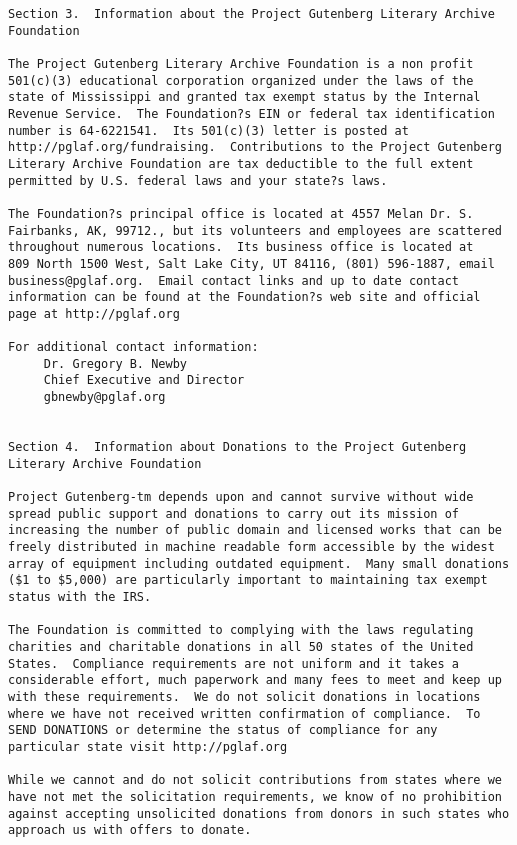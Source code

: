 \begin{Verbatim}[fontsize=\footnotesize]
Section 3.  Information about the Project Gutenberg Literary Archive
Foundation

The Project Gutenberg Literary Archive Foundation is a non profit
501(c)(3) educational corporation organized under the laws of the
state of Mississippi and granted tax exempt status by the Internal
Revenue Service.  The Foundation?s EIN or federal tax identification
number is 64-6221541.  Its 501(c)(3) letter is posted at
http://pglaf.org/fundraising.  Contributions to the Project Gutenberg
Literary Archive Foundation are tax deductible to the full extent
permitted by U.S. federal laws and your state?s laws.

The Foundation?s principal office is located at 4557 Melan Dr. S.
Fairbanks, AK, 99712., but its volunteers and employees are scattered
throughout numerous locations.  Its business office is located at
809 North 1500 West, Salt Lake City, UT 84116, (801) 596-1887, email
business@pglaf.org.  Email contact links and up to date contact
information can be found at the Foundation?s web site and official
page at http://pglaf.org

For additional contact information:
     Dr. Gregory B. Newby
     Chief Executive and Director
     gbnewby@pglaf.org


Section 4.  Information about Donations to the Project Gutenberg
Literary Archive Foundation

Project Gutenberg-tm depends upon and cannot survive without wide
spread public support and donations to carry out its mission of
increasing the number of public domain and licensed works that can be
freely distributed in machine readable form accessible by the widest
array of equipment including outdated equipment.  Many small donations
($1 to $5,000) are particularly important to maintaining tax exempt
status with the IRS.

The Foundation is committed to complying with the laws regulating
charities and charitable donations in all 50 states of the United
States.  Compliance requirements are not uniform and it takes a
considerable effort, much paperwork and many fees to meet and keep up
with these requirements.  We do not solicit donations in locations
where we have not received written confirmation of compliance.  To
SEND DONATIONS or determine the status of compliance for any
particular state visit http://pglaf.org

While we cannot and do not solicit contributions from states where we
have not met the solicitation requirements, we know of no prohibition
against accepting unsolicited donations from donors in such states who
approach us with offers to donate.


\end{Verbatim}
